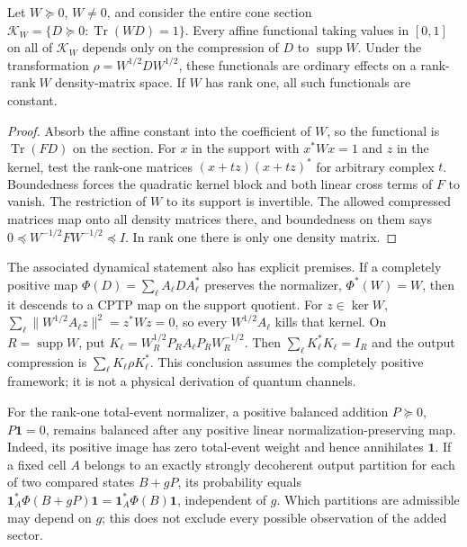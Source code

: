 \begin{proposition}
Let $W\succeq0$, $W\ne0$, and consider the entire cone section
$\mathcal K_W=\{D\succeq0:\operatorname{Tr}(WD)=1\}$. Every affine functional taking values in $[0,1]$ on all of $\mathcal K_W$ depends only on the compression of $D$ to $\operatorname{supp}W$. Under the transformation $\rho=W^{1/2}DW^{1/2}$, these functionals are ordinary effects on a rank-$\operatorname{rank}W$ density-matrix space. If $W$ has rank one, all such functionals are constant.
\end{proposition}
\begin{proof}
Absorb the affine constant into the coefficient of $W$, so the functional is $\operatorname{Tr}(FD)$ on the section. For $x$ in the support with $x^*Wx=1$ and $z$ in the kernel, test the rank-one matrices $(x+tz)(x+tz)^*$ for arbitrary complex $t$. Boundedness forces the quadratic kernel block and both linear cross terms of $F$ to vanish. The restriction of $W$ to its support is invertible. The allowed compressed matrices map onto all density matrices there, and boundedness on them says $0\preceq W^{-1/2}FW^{-1/2}\preceq I$. In rank one there is only one density matrix.
\end{proof}

The associated dynamical statement also has explicit premises. If a completely positive map $\Phi(D)=\sum_\ell A_\ell D A_\ell^*$ preserves the normalizer, $\Phi^*(W)=W$, then it descends to a CPTP map on the support quotient. For $z\in\ker W$,
$\sum_\ell\|W^{1/2}A_\ell z\|^2=z^*Wz=0$, so every $W^{1/2}A_\ell$ kills that kernel. On $R=\operatorname{supp}W$, put
$K_\ell=W_R^{1/2}P_RA_\ell P_RW_R^{-1/2}$.
Then $\sum_\ell K_\ell^*K_\ell=I_R$ and the output compression is
$\sum_\ell K_\ell\rho K_\ell^*$. This conclusion assumes the completely positive framework; it is not a physical derivation of quantum channels.

For the rank-one total-event normalizer, a positive balanced addition $P\succeq0$, $P\mathbf1=0$, remains balanced after any positive linear normalization-preserving map. Indeed, its positive image has zero total-event weight and hence annihilates $\mathbf1$. If a fixed cell $A$ belongs to an exactly strongly decoherent output partition for each of two compared states $B+gP$, its probability equals
$\mathbf1_A^*\Phi(B+gP)\mathbf1=\mathbf1_A^*\Phi(B)\mathbf1$,
independent of $g$. Which partitions are admissible may depend on $g$; this does not exclude every possible observation of the added sector.

